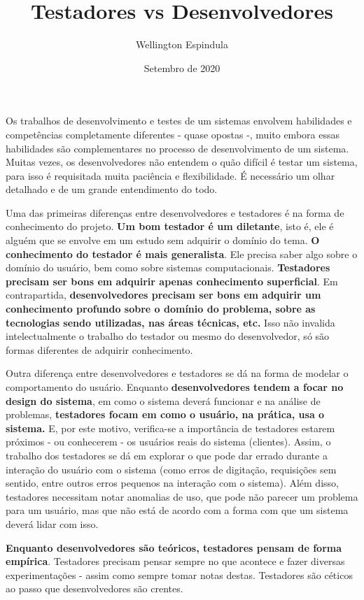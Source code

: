 \documentclass[12pt, a4paper]{article}
\title{Testadores vs Desenvolvedores}
\author{Wellington Espindula}
\date{Setembro de 2020}
\newcommand{\tb}[1]{\textbf{#1}}
\begin{document}
    \maketitle
    
    Os trabalhos de desenvolvimento e testes de um sistemas envolvem habilidades e competências completamente diferentes - quase opostas -, muito embora essas habilidades são complementares no processo de desenvolvimento de um sistema. Muitas vezes, os desenvolvedores não entendem o quão difícil é testar um sistema, para isso é requisitada muita paciência e flexibilidade. É necessário um olhar detalhado e de um grande entendimento do todo. 
    
    Uma das primeiras diferenças entre desenvolvedores e testadores é na forma de conhecimento do projeto. \tb{Um bom testador é um diletante}, isto é, ele é alguém que se envolve em um estudo sem adquirir o domínio do tema. \tb{O conhecimento do testador é mais generalista}. Ele precisa saber algo sobre o domínio do usuário, bem como sobre sistemas computacionais. \tb{Testadores precisam ser bons em adquirir apenas conhecimento superficial}. Em contrapartida, \tb{desenvolvedores precisam ser bons em adquirir um conhecimento profundo sobre o domínio do problema, sobre as tecnologias sendo utilizadas, nas áreas técnicas, etc.} Isso não invalida intelectualmente o trabalho do testador ou mesmo do desenvolvedor, só são formas diferentes de adquirir conhecimento.
    
    Outra diferença entre desenvolvedores e testadores se dá na forma de modelar o comportamento do usuário. Enquanto \tb{desenvolvedores tendem a focar no design do sistema}, em como o sistema deverá funcionar e na análise de problemas, \tb{testadores focam em como o usuário, na prática, usa o sistema.} E, por este motivo, verifica-se a importância de testadores estarem próximos - ou conhecerem - os usuários reais do sistema (clientes). Assim, o trabalho dos testadores se dá em explorar o que pode dar errado durante a interação do usuário com o sistema (como erros de digitação, requisições sem sentido, entre outros erros pequenos na interação com o sistema). Além disso, testadores necessitam notar anomalias de uso, que pode não parecer um problema para um usuário, mas que não está de acordo com a forma com que um sistema deverá lidar com isso.
    
    \tb{Enquanto desenvolvedores são teóricos, testadores pensam de forma empírica}. Testadores precisam pensar sempre no que acontece e fazer diversas experimentações - assim como sempre tomar notas destas. Testadores são céticos ao passo que desenvolvedores são crentes. 
    
\end{document}
